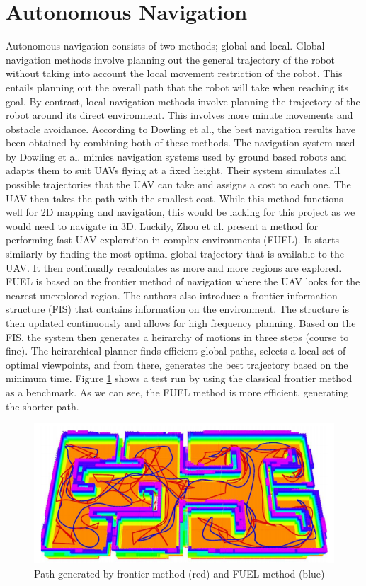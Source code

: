\documentclass[english]{upeeei}
\begin{document}
\section{Autonomous Navigation}
Autonomous navigation consists of two methods; global and local. Global navigation methods involve planning out the general
trajectory of the robot without taking into account the local movement restriction of the robot. This entails planning out
the overall path that the robot will take when reaching its goal. By contrast, local navigation methods involve planning
the trajectory of the robot around its direct environment. This involves more minute movements and obstacle avoidance. 
According to Dowling et al., the best navigation results have been obtained by combining both of these methods\cite{Dowling2018}. The
navigation system used by Dowling et al. mimics navigation systems used by ground based robots and adapts them to suit
UAVs flying at a fixed height. Their system simulates all possible trajectories that the UAV can take and assigns a cost
to each one. The UAV then takes the path with the smallest cost. While this method functions well for 2D mapping and
navigation, this would be lacking for this project as we would need to navigate in 3D. Luckily, Zhou et al. present a method 
for performing fast UAV exploration in complex environments (FUEL)\cite{Fuel2020}. It starts similarly by finding the most optimal
global trajectory that is available to the UAV. It then continually recalculates as more and more regions are explored.
FUEL is based on the frontier method of navigation where the UAV looks for the nearest unexplored region. The authors also
introduce a frontier information structure (FIS) that contains information on the environment. The structure is then updated
continuously and allows for high frequency planning. Based on the FIS, the system then generates a heirarchy of motions
in three steps (course to fine). The heirarchical planner finds efficient global paths, selects a local set of optimal
viewpoints, and from there, generates the best trajectory based on the minimum time. Figure \ref{fig:fueltest} shows a test
run by using the classical frontier method as a benchmark. As we can see, the FUEL method is more efficient, generating the
shorter path.
\begin{figure}[h]
    \centering
    \includegraphics[scale=0.5]{images/fueltest.PNG}
    \caption{Path generated by frontier method (red) and FUEL method (blue)\cite{Fuel2020}}
    \label{fig:fueltest}
\end{figure}
\end{document}

